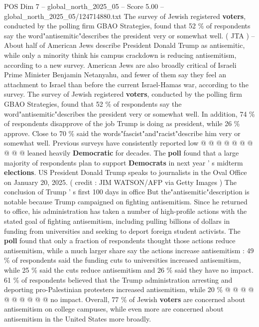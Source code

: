 \begin{textsample}{POS Dim 7 – global\_north\_2025\_05 – Score 5.00 – global\_north\_2025\_05/124714880.txt}  \label{ex:f7_pos_335}
The survey of Jewish registered \textbf{voters}, conducted by the polling firm GBAO Strategies, found that 52 \% of respondents say the word"antisemitic"describes the president very or somewhat well. ( JTA ) -- About half of American Jews describe President Donald Trump as antisemitic, while only a minority think his campus crackdown is reducing antisemitism, according to a new survey.
American Jews are also broadly critical of Israeli Prime Minister Benjamin Netanyahu, and fewer of them say they feel an attachment to Israel than before the current Israel-Hamas war, according to the survey.
The survey of Jewish registered \textbf{voters}, conducted by the polling firm GBAO Strategies, found that 52 \% of respondents say the word"antisemitic"describes the president very or somewhat well.
In addition, 74 \% of respondents disapprove of the job Trump is doing as president, while 26 \% approve.
Close to 70 \% said the words"fascist"and"racist"describe him very or somewhat well.
Previous surveys have consistently reported low @ @ @ @ @ @ @ @ @ @ leaned heavily \textbf{Democratic} for decades.
The \textbf{poll} found that a large majority of respondents plan to support \textbf{Democrats} in next year ' s midterm \textbf{elections}.
US President Donald Trump speaks to journalists in the Oval Office on January 20, 2025. ( credit : JIM WATSON/AFP via Getty Images ) The conclusion of Trump ' s first 100 days in office But the"antisemitic"description is notable because Trump campaigned on fighting antisemitism.
Since he returned to office, his administration has taken a number of high-profile actions with the stated goal of fighting antisemitism, including pulling billions of dollars in funding from universities and seeking to deport foreign student activists.
The \textbf{poll} found that only a fraction of respondents thought those actions reduce antisemitism, while a much larger share say the actions increase antisemitism : 49 \% of respondents said the funding cuts to universities increased antisemitism, while 25 \% said the cuts reduce antisemitism and 26 \% said they have no impact. 61 \% of respondents believed that the Trump administration arresting and deporting pro-Palestinian protesters increased antisemitism, while 20 \% @ @ @ @ @ @ @ @ @ @ no impact.
Overall, 77 \% of Jewish \textbf{voters} are concerned about antisemitism on college campuses, while even more are concerned about antisemitism in the United States more broadly.

\end{textsample}
